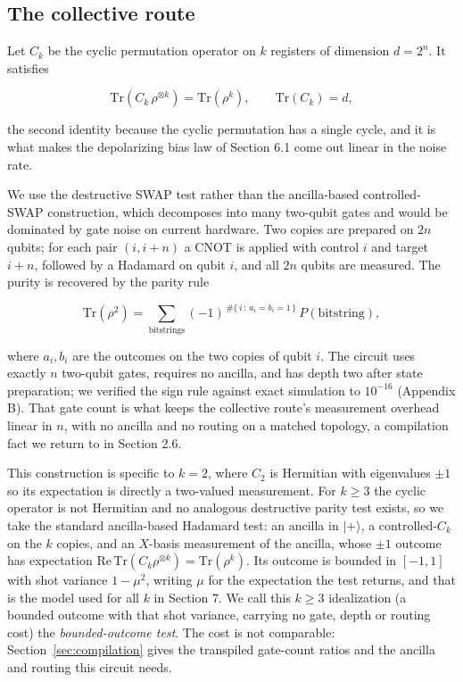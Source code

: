 \documentclass[a4paper,superscriptaddress,nofootinbib,onecolumn,nopdfoutputerror]{quantumarticle}
\begin{document}
\hypertarget{the-collective-route}{%
\subsection{The collective route}\label{the-collective-route}}

Let \(C_k\) be the cyclic permutation operator on \(k\) registers of
dimension \(d = 2^n\). It satisfies

\[\mathrm{Tr}\!\left( C_k\, \rho^{\otimes k} \right) = \mathrm{Tr}(\rho^k), \qquad \mathrm{Tr}(C_k) = d,\]

the second identity because the cyclic permutation has a single cycle, and
it is what makes the depolarizing bias law of Section 6.1 come out linear
in the noise rate.

We use the destructive SWAP test rather than the ancilla-based
controlled-SWAP construction, which decomposes into many two-qubit gates
and would be dominated by gate noise on current hardware. Two copies are
prepared on \(2n\) qubits; for each pair \((i, i+n)\) a CNOT is applied
with control \(i\) and target \(i+n\), followed by a Hadamard on qubit
\(i\), and all \(2n\) qubits are measured. The purity is recovered by the
parity rule

\[\mathrm{Tr}(\rho^2) = \sum_{\text{bitstrings}} (-1)^{\,\#\{\,i \,:\, a_i = b_i = 1\,\}} \, P(\text{bitstring}),\]

where \(a_i, b_i\) are the outcomes on the two copies of qubit \(i\). The
circuit uses exactly \(n\) two-qubit gates, requires no ancilla, and has
depth two after state preparation; we verified the sign rule against exact
simulation to \(10^{-16}\) (Appendix B). That gate count is what keeps the
collective route's measurement overhead linear in \(n\), with no ancilla and no
routing on a matched topology, a compilation fact we return to in Section 2.6.

This construction is specific to \(k = 2\), where \(C_2\) is Hermitian
with eigenvalues \(\pm 1\) so its expectation is directly a two-valued
measurement. For \(k \geq 3\) the cyclic operator is not Hermitian and no
analogous destructive parity test exists, so we take the standard
ancilla-based Hadamard test: an ancilla in \(|+\rangle\), a
controlled-\(C_k\) on the \(k\) copies, and an \(X\)-basis measurement of
the ancilla, whose \(\pm 1\) outcome has expectation
\(\mathrm{Re}\,\mathrm{Tr}(C_k \rho^{\otimes k}) = \mathrm{Tr}(\rho^k)\).
Its outcome is bounded in \([-1, 1]\) with shot variance \(1 - \mu^2\), writing \(\mu\)
for the expectation the test returns, and that is the model used for all \(k\) in Section 7. We
call this \(k \ge 3\) idealization (a bounded outcome with that shot variance, carrying no
gate, depth or routing cost) the \emph{bounded-outcome test}. The cost is not comparable: Section~\ref{sec:compilation} gives the transpiled
gate-count ratios and the ancilla and routing this circuit needs.
\end{document}
